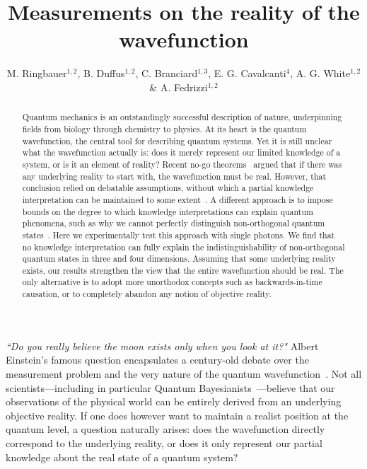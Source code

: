 \documentclass[aps,prl,floatfix,onecolumn,tightenlines,amsmath,amssymb,nofootinbib,12pt]{revtex4-2}
\begin{document}
\title{Measurements on the reality of the wavefunction}
\author{M. Ringbauer$^{1,2}$, B. Duffus$^{1,2}$, C. Branciard$^{1,3}$, E. G. Cavalcanti$^{4}$, A. G. White$^{1,2}$ \& A. Fedrizzi$^{1,2}$}


\begin{abstract}
Quantum mechanics is an outstandingly successful description of nature, underpinning fields from biology through chemistry to physics. At its heart is the quantum wavefunction, the central tool for describing quantum systems. Yet it is still unclear what the wavefunction actually is: does it merely represent our limited knowledge of a system, or is it an element of reality? Recent no-go theorems~\cite{Pusey2012,Colbeck2011,hardy2013are,Patra2013no-,Aaronson2013,Colbeck2013} argued that if there was any underlying reality to start with, the wavefunction must be real. However, that conclusion relied on debatable assumptions, without which a partial knowledge interpretation can be maintained to some extent~\cite{Lewis2012,Aaronson2013}. A different approach is to impose bounds on the degree to which knowledge interpretations can explain quantum phenomena, such as why we cannot perfectly distinguish non-orthogonal quantum states~\cite{Barrett2014,Leifer2014,Branciard2014a}. Here we experimentally test this approach with single photons. We find that no knowledge interpretation can fully explain the indistinguishability of non-orthogonal quantum states in three and four dimensions. Assuming that some underlying reality exists, our results strengthen the view that the entire wavefunction should be real. The only alternative is to adopt more unorthodox concepts such as backwards-in-time causation, or to completely abandon any notion of objective reality.
\end{abstract}

\maketitle

\newpage

\emph{``Do you really believe the moon exists only when you look at it?"} Albert Einstein's famous question encapsulates a century-old debate over the measurement problem and the very nature of the quantum wavefunction~\cite{mermin1985moon}. Not all scientists---including in particular Quantum Bayesianists~\cite{mermin2000QBism,caves2002quantum,Fuchs2010}---believe that our observations of the physical world can be entirely derived from an underlying objective reality. If one does however want to maintain a realist position at the quantum level, a question naturally arises: does the wavefunction directly correspond to the underlying reality, or does it only represent our partial knowledge about the real state of a quantum system?
\end{document}
